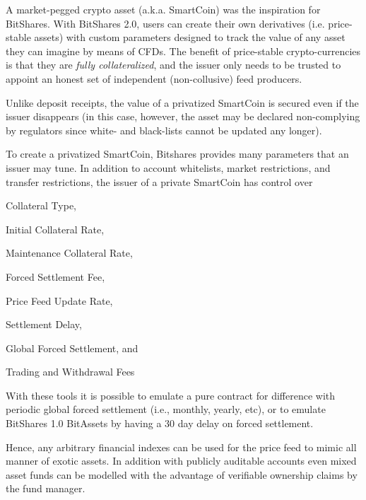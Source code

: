\label{sec:uia:priv}

A market-pegged crypto asset (a.k.a. SmartCoin) was the inspiration for
BitShares. With BitShares 2.0, users can create their own derivatives (i.e.
price-stable assets) with custom parameters designed to track the value of any
asset they can imagine by means of CFDs. The benefit of price-stable
crypto-currencies is that they are \emph{fully collateralized}, and the issuer
only needs to be trusted to appoint an honest set of independent
(non-collusive) feed producers. 

Unlike deposit receipts, the value of a privatized SmartCoin is secured even if
the issuer disappears (in this case, however, the asset may be declared
non-complying by regulators since white- and black-lists cannot be updated any
longer).

To create a privatized SmartCoin, Bitshares provides many parameters that an
issuer may tune. In addition to account whitelists, market restrictions, and
transfer restrictions, the issuer of a private SmartCoin has control over
\begin{inparaenum}[(a)]
 \item Collateral Type,
 \item Initial Collateral Rate,
 \item Maintenance Collateral Rate,
 \item Forced Settlement Fee, 
 \item Price Feed Update Rate,
 \item Settlement Delay, %
 \item Global Forced Settlement, and
 \item Trading and Withdrawal Fees
\end{inparaenum}

With these tools it is possible to emulate a pure contract for difference with
periodic global forced settlement (i.e., monthly, yearly, etc), or to emulate
BitShares 1.0 BitAssets by having a 30 day delay on forced settlement.

Hence, any arbitrary financial indexes can be used for the price feed to mimic
all manner of exotic assets. In addition with publicly auditable accounts even
mixed asset funds can be modelled with the advantage of verifiable ownership
claims by the fund manager.
